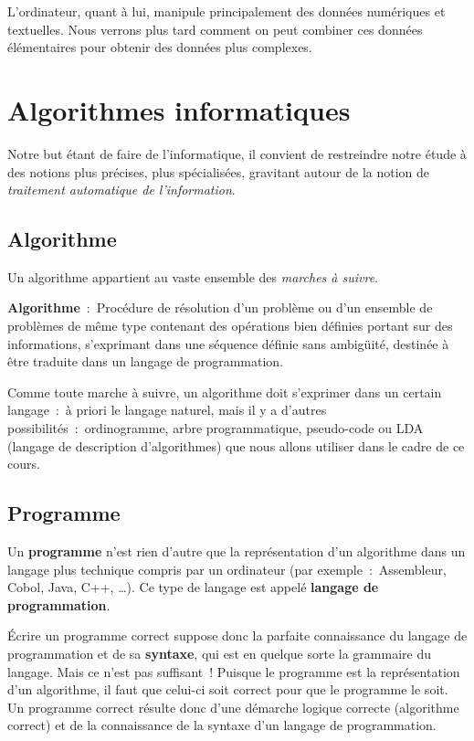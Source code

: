 		L’ordinateur, quant à lui, manipule principalement
		des données numériques et textuelles. 
		Nous verrons plus tard comment on
		peut combiner ces données élémentaires pour obtenir 
		des données plus complexes.

\section{Algorithmes informatiques}

	Notre but étant de faire de l’informatique, il convient de restreindre
	notre étude à des notions plus précises, plus spécialisées, gravitant
	autour de la notion de \textit{traitement automatique de
	l’information}.

	\subsection{Algorithme}

		Un algorithme appartient au vaste ensemble des \textit{marches à
		suivre}.

		\textbf{Algorithme}~:~Procédure de résolution d’un problème 
		ou d’un ensemble de problèmes de même type contenant des opérations
		bien définies portant sur des informations, s’exprimant dans une
		séquence définie sans ambigüité, destinée à être traduite dans 
		un langage de programmation.
	
		Comme toute marche à suivre, un algorithme doit s’exprimer dans un
		certain langage~:~à priori le langage naturel, mais il y a d’autres
		possibilités~:~ordinogramme, arbre programmatique, pseudo-code ou LDA
		(langage de description d’algorithmes) que nous allons utiliser dans le
		cadre de ce cours.

	\subsection{Programme}

		Un \textbf{programme} n’est rien d’autre que la représentation d’un
		algorithme dans un langage plus technique compris par 
		un ordinateur (par exemple~:~Assembleur, Cobol, Java, 
		C++, \dots). Ce type de langage est appelé \textbf{langage de
		programmation}.
		
		Écrire un programme correct suppose donc la parfaite connaissance du
		langage de programmation et de sa \textbf{syntaxe}, qui est en quelque
		sorte la grammaire du langage. Mais ce n’est pas suffisant~! Puisque le
		programme est la représentation d’un algorithme, il faut que celui-ci
		soit correct pour que le programme le soit. Un programme correct
		résulte donc d’une démarche logique correcte (algorithme correct) et de
		la connaissance de la syntaxe d’un langage de programmation.
		
